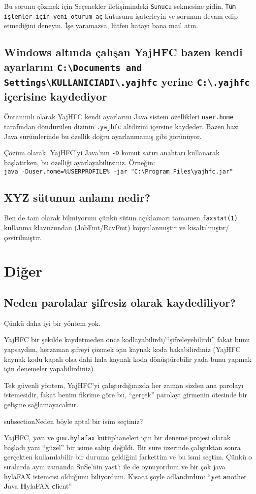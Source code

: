 \documentclass[a4paper,10pt]{scrartcl}
\begin{document}
Bu sorunu çözmek için Seçenekler iletişimindeki \texttt{Sunucu} sekmesine gidin, \texttt{Tüm işlemler için yeni oturum aç} kutusunu işaterleyin ve sorunun devam edip etmediğini deneyin.
İşe yaramazsa, lütfen hatayı bana mail atın.

\subsection{Windows altında çalışan YajHFC bazen kendi ayarlarını \texttt{C:\textbackslash Documents and Settings\textbackslash KULLANICIADI\textbackslash .yajhfc} yerine \texttt{C:\textbackslash .yajhfc} içerisine kaydediyor}

Öntanımlı olarak YajHFC kendi ayarlarını Java sistem özellikleri \texttt{user.home} tarafından döndürülen dizinin 
\texttt{.yajhfc} altdizini içersine kaydeder.
Bazen bazı Java sürümlerinde bu özellik doğru ayarlanmamış gibi görünüyor.

Çözüm olarak, YajHFC'yi Java'nın \texttt{-D} komut satırı anahtarı kullanarak başlatırken, bu özelliği ayarlayabilirsiniz. Örneğin: \\
\texttt{java -Duser.home=\%USERPROFILE\% -jar "C:\textbackslash Program Files\textbackslash yajhfc.jar"}

\subsection{XYZ sütunun anlamı nedir?}

Ben de tam olarak bilmiyorum çünkü sütun açıklamarı 
tamamen \verb.faxstat(1). kullanma klavuzundan (JobFmt/RcvFmt) kopyalanmıştır
ve kısaltılmıştır/çevirilmiştir. 

\section{Diğer}

\subsection{Neden parolalar şifresiz olarak kaydediliyor?}

Çünkü daha iyi bir yöntem yok.

YajHFC bir şekilde kaydetmeden önce kodlayabilirdi/``şifreleyebilirdi'' fakat
bunu yapsaydım, herzaman şifreyi çözmek için kaynak koda bakabilirdiniz 
(YajHFC kaynak kodu kapalı olsa dahi hala kaynak koda dönüştürebilir 
yada bunu yapmak için denemeler yapabilirdiniz).

Tek güvenli yöntem, YajHFC'yi çalıştırdığınızda her zaman sizden ana parolayı 
istemesidir, fakat benim fikrime göre bu, ``gerçek'' parolayı girmenin ötesinde
bir gelişme sağlamayacaktır.


subsection{Neden böyle aptal bir isim seçtiniz?}

YajHFC, java ve \texttt{gnu.hylafax} kütüphaneleri için bir deneme projesi olarak başladı
yani ``güzel'' bir isime sahip değildi. Bir süre üzerinde çalıştıktan sonra 
gerçekten kullanılabilir bir duruma geldiğini farkettim ve bu ismi seçtim. 
Çünkü o sıralarda aynı zamanda SuSe'nin yast'ı ile de oynuyordum ve bir çok java hylaFAX istemcisi 
olduğunu biliyordum. Kısaca şöyle adlandırdım:
``\textbf{y}et \textbf{a}nother \textbf{J}ava \textbf{H}ylaFAX \textbf{c}lient''
\end{document}
